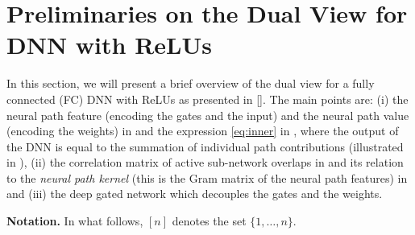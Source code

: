 \section{Preliminaries on the Dual View for DNN with ReLUs}\label{sec:dual}
In this section, we will present a brief overview of the dual view for a fully connected (FC) DNN with ReLUs as presented in []. The main points are: (i) the neural path feature (encoding the gates and the input) and the neural path value (encoding the weights) in  and the expression \eqref{eq:inner} in , where the output of the DNN is equal to the summation of individual path contributions (illustrated in ), (ii) the correlation matrix of active sub-network overlaps in  and its relation to the \emph{neural path kernel} (this is the Gram matrix of the neural path features) in  and (iii) the deep gated network which decouples the gates and the weights.

\textbf{Notation.} In what follows, $[n]$ denotes the set $\{1,\ldots,n\}$.

